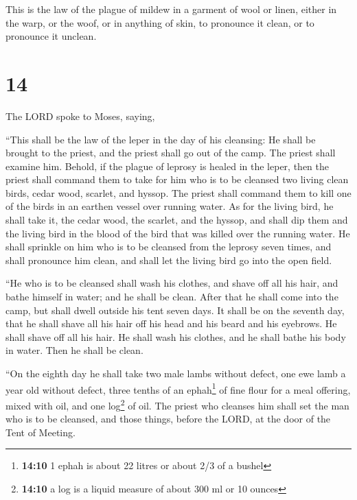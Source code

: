  This is the law of the plague of mildew in a garment of
wool or linen, either in the warp, or the woof, or in anything of skin,
to pronounce it clean, or to pronounce it unclean.

\hypertarget{section-13}{%
\section{14}\label{section-13}}

 The LORD spoke to Moses, saying,

 ``This shall be the law of the leper in the day of his
cleansing: He shall be brought to the priest,  and the
priest shall go out of the camp. The priest shall examine him. Behold,
if the plague of leprosy is healed in the leper,  then the
priest shall command them to take for him who is to be cleansed two
living clean birds, cedar wood, scarlet, and hyssop.  The
priest shall command them to kill one of the birds in an earthen vessel
over running water.  As for the living bird, he shall take
it, the cedar wood, the scarlet, and the hyssop, and shall dip them and
the living bird in the blood of the bird that was killed over the
running water.  He shall sprinkle on him who is to be
cleansed from the leprosy seven times, and shall pronounce him clean,
and shall let the living bird go into the open field.

 ``He who is to be cleansed shall wash his clothes, and
shave off all his hair, and bathe himself in water; and he shall be
clean. After that he shall come into the camp, but shall dwell outside
his tent seven days.  It shall be on the seventh day, that
he shall shave all his hair off his head and his beard and his eyebrows.
He shall shave off all his hair. He shall wash his clothes, and he shall
bathe his body in water. Then he shall be clean.

 ``On the eighth day he shall take two male lambs without
defect, one ewe lamb a year old without defect, three tenths of an
ephah\footnote{\textbf{14:10} 1 ephah is about 22 litres or about 2/3 of
  a bushel} of fine flour for a meal offering, mixed with oil, and one
log\footnote{\textbf{14:10} a log is a liquid measure of about 300 ml or
  10 ounces} of oil.  The priest who cleanses him shall
set the man who is to be cleansed, and those things, before the LORD, at
the door of the Tent of Meeting.

